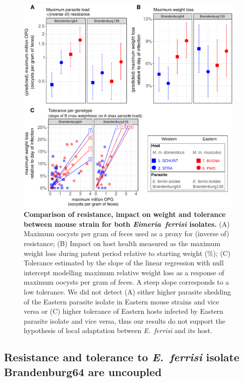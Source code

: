 \begin{figure}[H]
    \centering
    \includegraphics[width=\linewidth,height=\textheight,keepaspectratio]{images/3article2/Fig3_final.pdf}
    \caption{\textbf{Comparison of resistance, impact on weight and tolerance between mouse strain for both \textit{Eimeria~ferrisi} isolates.} (A) Maximum oocysts per gram of feces used as a proxy for (inverse of) resistance; (B) Impact on host health measured as the maximum weight loss during patent period relative to starting weight (\%); (C) Tolerance estimated by the slope of the linear regression with null intercept modelling maximum relative weight loss as a response of maximum oocysts per gram of feces. A steep slope corresponds to a low tolerance. We did not detect (A) either higher parasite shedding of the Eastern parasite isolate in Eastern mouse strains and vice versa or (C) higher tolerance of Eastern hosts infected by Eastern parasite isolate and vice versa, thus our results do not support the hypothesis of local adaptation between \textit{E.~ferrisi} and its host.}
\end{figure}


\subsection{Resistance and tolerance to \textit{E.~ferrisi }isolate Brandenburg64 are uncoupled}

